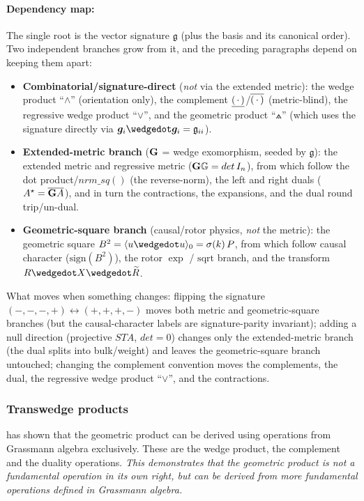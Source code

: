\paragraph{Dependency map:} The single root is the vector signature $\mathfrak{g}$ (plus
the basis and its canonical
order). Two independent branches grow from it, and the preceding paragraphs depend on
keeping them apart:
\begin{itemize}
    \item \textbf{Combinatorial/signature-direct} (\emph{not} via the extended metric):
    the wedge product ``$\wedge$'' (orientation only), the complement
    $\underline{(\,\cdot\,)}$/$\overline{(\,\cdot\,)}$ (metric-blind), the regressive wedge
    product ``$\vee$'', and the geometric product ``$\wedgedot$'' (which uses the signature
    directly via $\gv{i} \wedgedot \gv{i} = \mathfrak{g}_{ii}$).
    \item \textbf{Extended-metric branch} ($\mathbf{G}$ = wedge exomorphism, seeded by
    $\mathfrak{g}$): the extended metric and regressive metric ($\mathbf{G}\mathbf{\mathbb{G}} =
    det\,I_n$), from which follow the dot product/$nrm\_sq()$ (the reverse-norm), the
    left and right duals ($A^{\star} = \overline{\mathbf{G}A}$), and in turn the
    contractions, the expansions, and the dual round trip/un-dual.
    \item \textbf{Geometric-square branch} (causal/rotor physics, \emph{not} the
    metric): the geometric square $B^2 = \grprj{u \wedgedot u}{0} = \sigma(k)\,P$, from
    which follow causal character ($\mathrm{sign}(B^2)$), the rotor $\exp$ /
    $\mathrm{sqrt}$ branch, and the transform $R \wedgedot X \wedgedot \rev{R}$.
\end{itemize}
What moves when something changes: flipping the signature $(-,-,-,+) \leftrightarrow
(+,+,+,-)$ moves both metric and geometric-square branches (but the causal-character
labels are signature-parity invariant); adding a null direction (projective $STA$, $det =
0$) changes only the extended-metric branch (the dual splits into bulk/weight) and
leaves the geometric-square branch untouched; changing the complement convention moves the
complements, the dual, the regressive wedge product ``$\vee$'', and the contractions.


\subsubsection{Transwedge products}
\label{subsection:transwedge_products}

\cite{Lengyel_transwedge_product:2025} has shown that the geometric product can be derived
using operations from Grassmann algebra exclusively. These are the wedge product, the
complement and the duality operations. \emph{This demonstrates that the geometric product
is not a fundamental operation in its own right, but can be derived from more fundamental
operations defined in Grassmann algebra.} \\

